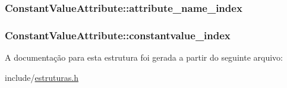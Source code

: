 \subsubsection[{\texorpdfstring{attribute\+\_\+name\+\_\+index}{attribute_name_index}}]{ Constant\+Value\+Attribute\+::attribute\+\_\+name\+\_\+index}\hypertarget{struct_constant_value_attribute_a29106b223531e4e2178ab37b7653c758}{}\label{struct_constant_value_attribute_a29106b223531e4e2178ab37b7653c758}
\subsubsection[{\texorpdfstring{constantvalue\+\_\+index}{constantvalue_index}}]{ Constant\+Value\+Attribute\+::constantvalue\+\_\+index}\hypertarget{struct_constant_value_attribute_acc45997fb7ce815924e042fec885525e}{}\label{struct_constant_value_attribute_acc45997fb7ce815924e042fec885525e}


A documentação para esta estrutura foi gerada a partir do seguinte arquivo\+:\begin{DoxyCompactItemize}
\item 
include/\hyperlink{estruturas_8h}{estruturas.\+h}\end{DoxyCompactItemize}
